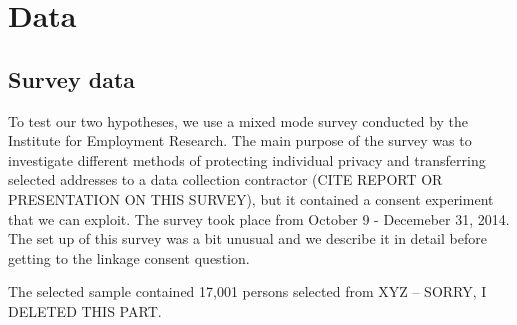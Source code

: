 


\section{Data}
\subsection {Survey data}

To test our two hypotheses, we use a mixed mode survey conducted by the Institute for Employment Research. The main purpose of the survey was to investigate different methods of protecting individual privacy and transferring selected addresses to a data collection contractor (CITE REPORT OR PRESENTATION ON THIS SURVEY), but it contained a consent experiment that we can exploit. The survey took place from October 9 - Decemeber 31, 2014. The set up of this survey was a bit unusual and we describe it in detail before getting to the linkage consent question.


The selected sample contained 17,001 persons selected from XYZ -- SORRY, I DELETED THIS PART. 

